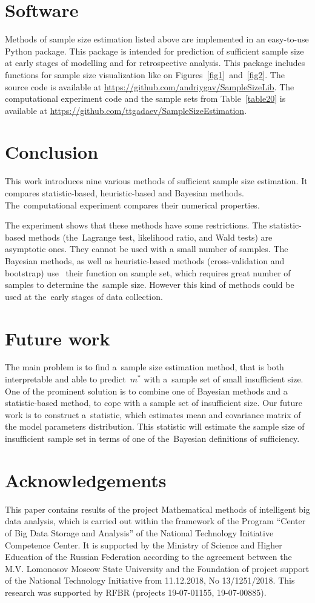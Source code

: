 \documentclass[
11pt,%
tightenlines,%
twoside,%
onecolumn,%
nofloats,%
nobibnotes,%
nofootinbib,%
superscriptaddress,%
noshowpacs,%
centertags]%
{revtex4}
\begin{document}
\section{Software}
Methods of sample size estimation listed above are implemented in an easy-to-use Python package. This package is intended for prediction of sufficient sample size at early stages of modelling and for retrospective analysis. This package includes functions for sample size visualization like on Figures~\ref{fig1}~and~\ref{fig2}. The source code is available at \mbox{\url{https://github.com/andriygav/SampleSizeLib}}. The computational experiment code and the sample sets from Table~\ref{table20} is available at \mbox{\url{https://github.com/ttgadaev/SampleSizeEstimation}}.

\section{Conclusion}
This work introduces nine various methods of sufficient sample size estimation. It compares statistic-based, heuristic-based and  Bayesian methods. The~computational experiment compares their numerical properties.

The  experiment shows that  these methods have some restrictions. The statistic-based methods (the~Lagrange test, likelihood ratio, and Wald tests) are asymptotic ones. They cannot be used with a small number of samples. The Bayesian methods, as well as heuristic-based methods (cross-validation and bootstrap) use~ their function on sample set, which requires great number of samples to determine the~sample size. However this kind of methods could be used at the~early stages of data collection.

\section{Future work}
The main problem is to find a~sample size estimation method, that is both interpretable and able to predict~$m^*$ with a~sample set of small insufficient size. One of the prominent solution is to combine one of Bayesian methods  and a statistic-based method, to cope with a sample set of insufficient size.  Our future work is to construct a~statistic, which estimates mean and covariance matrix of the model parameters distribution. This statistic will estimate the sample size of insufficient sample set in terms of one of the~Bayesian definitions of sufficiency. 

\section*{Acknowledgements}
This paper contains results of the project Mathematical methods of intelligent big data analysis, which is carried out within the framework of the Program ``Center of Big Data Storage and Analysis'' of the National Technology Initiative Competence Center. It is supported by the Ministry of Science and Higher Education of the Russian Federation according to the agreement between the M.V. Lomonosov Moscow State University and the Foundation of project support of the National Technology Initiative from 11.12.2018, No 13/1251/2018. This research was supported by RFBR (projects 19-07-01155, 19-07-00885).
\end{document}
